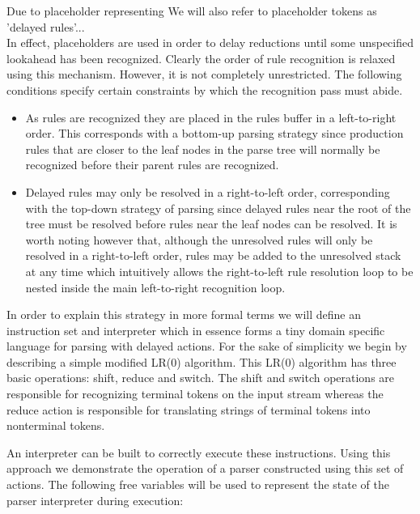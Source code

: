 \documentclass[11pt]{article}
\begin{document}
Due to placeholder representing We will also refer to placeholder tokens as 'delayed rules'...\\


In effect, placeholders are used in order to delay reductions until some unspecified lookahead has been recognized.
Clearly the order of rule recognition is relaxed using this mechanism. However, it is not completely unrestricted. 
The following conditions specify certain constraints by which the recognition pass must abide.

\begin{itemize}
\item As rules are recognized they are placed in the rules buffer in a left-to-right order. This corresponds with a bottom-up parsing strategy since production rules that are closer to the leaf nodes in the parse tree will normally be recognized before their parent rules are recognized.
\item Delayed rules may only be resolved in a right-to-left order, corresponding with the top-down strategy of parsing since delayed rules near the root of the tree must be resolved before 
rules near the leaf nodes can be resolved. 
It is worth noting however that, although the unresolved rules will only be resolved in a right-to-left order, rules may be added to the unresolved stack at any time which intuitively
allows the right-to-left rule resolution loop to be nested inside the main left-to-right recognition loop.
\end{itemize}

In order to explain this strategy in more formal terms we will define an instruction set and interpreter which in essence forms a tiny domain specific language for parsing with delayed actions.
For the sake of simplicity we begin by describing a simple modified LR(0) algorithm. This LR(0) algorithm has three basic operations: shift, reduce and switch. 
The shift and switch operations are responsible for recognizing terminal tokens on the input stream whereas the reduce action is responsible for translating strings of terminal tokens into nonterminal tokens.

An interpreter can be built to correctly execute these instructions. 
Using this approach we demonstrate the operation of a parser constructed using this set of actions.
The following free variables will be used to represent the state of the parser interpreter during execution:
\end{document}
